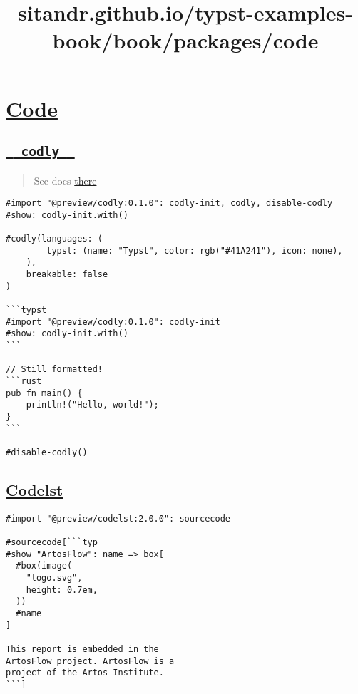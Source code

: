 \title{sitandr.github.io/typst-examples-book/book/packages/code}

\section{\texorpdfstring{\hyperref[code]{Code}}{Code}}\label{code}

\subsection{\texorpdfstring{\hyperref[codly]{\texttt{\ }{\texttt{\ codly\ }}\texttt{\ }}}{  codly  }}\label{codly}

\begin{quote}
See docs \href{https://github.com/Dherse/codly}{there}
\end{quote}

\begin{verbatim}
#import "@preview/codly:0.1.0": codly-init, codly, disable-codly
#show: codly-init.with()

#codly(languages: (
        typst: (name: "Typst", color: rgb("#41A241"), icon: none),
    ),
    breakable: false
)

```typst
#import "@preview/codly:0.1.0": codly-init
#show: codly-init.with()
```

// Still formatted!
```rust
pub fn main() {
    println!("Hello, world!");
}
```

#disable-codly()
\end{verbatim}

\pandocbounded{}

\subsection{\texorpdfstring{\hyperref[codelst]{Codelst}}{Codelst}}\label{codelst}

\begin{verbatim}
#import "@preview/codelst:2.0.0": sourcecode

#sourcecode[```typ
#show "ArtosFlow": name => box[
  #box(image(
    "logo.svg",
    height: 0.7em,
  ))
  #name
]

This report is embedded in the
ArtosFlow project. ArtosFlow is a
project of the Artos Institute.
```]
\end{verbatim}

\pandocbounded{}
